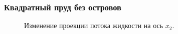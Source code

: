 \documentclass[10pt,utf8,presentation,compress]{beamer}
\begin{document}
\begin{frame}
\frametitle{Квадратный пруд без островов}
	\begin{figure}[H]
		\centering
		\hfill
		\hfill
		\caption{Изменение проекции потока жидкости на ось $x_2$.}
	\end{figure}
\end{frame}
\end{document}
